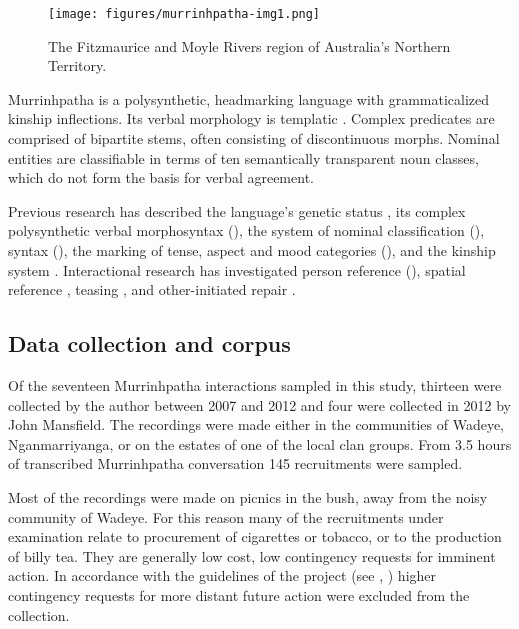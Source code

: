 \documentclass[output=paper,nonflat,colorlinks,citecolor=brown]{langsci/langscibook}
\begin{document}
\begin{figure}
\texttt{[image: figures/murrinhpatha-img1.png]}
\caption{
The Fitzmaurice and Moyle Rivers region of Australia's Northern Territory.
\label{fig:blythe:1}
}\end{figure}

Murrinhpatha is a polysynthetic, headmarking language with grammaticalized kinship inflections. Its verbal morphology is templatic \citep{Nordlinger2010b}. Complex predicates are comprised of bipartite stems, often consisting of discontinuous morphs. Nominal entities are classifiable in terms of ten semantically transparent noun classes, which do not form the basis for verbal agreement.

Previous research has described the language’s genetic status \citep{Green2003}, its complex polysynthetic verbal morphosyntax (\citealt{%
Walsh1976,Walsh1996,Walsh1987,
Street1980,Street1987,
Blythe2009,Blythe2010a,Blythe2013,
Nordlinger2010a,Nordlinger2010b,
Mansfield2014b,
Forshaw2016,Forshaw-et-al2017}), the system of nominal classification (\citealt{Walsh1993,Walsh1997}), syntax (\citealt{Nordlinger2011,Mujkic2013}), the marking of tense, aspect and mood categories (\citealt{Nordlinger2012}), and the kinship system \citep{Blythe2018}. Interactional research has investigated person reference (\citealt{Blythe2009,Blythe2010b,Blythe2013}), spatial reference \citep{Blythe2016}, teasing \citep{Blythe2012}, and other-initiated repair \citep{Blythe2015}.

\subsection{Data collection and corpus}\label{sec:blythe:1.2}

Of the seventeen Murrinhpatha interactions sampled in this study, thirteen were collected by the author between 2007 and 2012 and four were collected in 2012 by John Mansfield. The recordings were made either in the communities of Wadeye, Nganmarriyanga, or on the estates of one of the local clan groups. From 3.5 hours of transcribed Murrinhpatha conversation 145 recruitments were sampled.


Most of the recordings were made on picnics in the bush, away from the noisy community of Wadeye. For this reason many of the recruitments under examination relate to procurement of cigarettes or tobacco, or to the production of billy tea. They are generally low cost, low contingency requests for imminent action. In accordance with the guidelines of the project (see , ) higher contingency requests for more distant future action were excluded from the collection.
\end{document}

